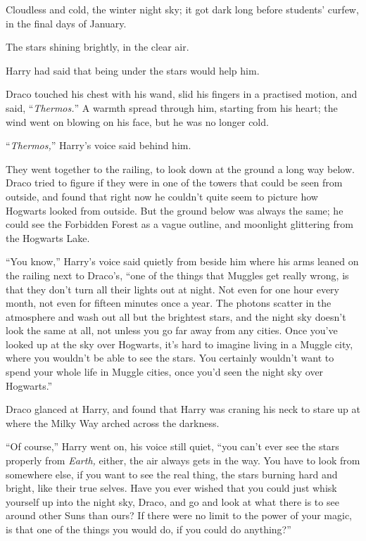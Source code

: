 Cloudless and cold, the winter night sky; it got dark long before students’ curfew, in the final days of January.

The stars shining brightly, in the clear air.

Harry had said that being under the stars would help him.

Draco touched his chest with his wand, slid his fingers in a practised motion, and said, “\emph{Thermos.}” A warmth spread through him, starting from his heart; the wind went on blowing on his face, but he was no longer cold.

“\emph{Thermos,}” Harry’s voice said behind him.

They went together to the railing, to look down at the ground a long way below. Draco tried to figure if they were in one of the towers that could be seen from outside, and found that right now he couldn’t quite seem to picture how Hogwarts looked from outside. But the ground below was always the same; he could see the Forbidden Forest as a vague outline, and moonlight glittering from the Hogwarts Lake.

“You know,” Harry’s voice said quietly from beside him where his arms leaned on the railing next to Draco’s, “one of the things that Muggles get really wrong, is that they don’t turn all their lights out at night. Not even for one hour every month, not even for fifteen minutes once a year. The photons scatter in the atmosphere and wash out all but the brightest stars, and the night sky doesn’t look the same at all, not unless you go far away from any cities. Once you’ve looked up at the sky over Hogwarts, it’s hard to imagine living in a Muggle city, where you wouldn’t be able to see the stars. You certainly wouldn’t want to spend your whole life in Muggle cities, once you’d seen the night sky over Hogwarts.”

Draco glanced at Harry, and found that Harry was craning his neck to stare up at where the Milky Way arched across the darkness.

“Of course,” Harry went on, his voice still quiet, “you can’t ever see the stars properly from \emph{Earth,} either, the air always gets in the way. You have to look from somewhere else, if you want to see the real thing, the stars burning hard and bright, like their true selves. Have you ever wished that you could just whisk yourself up into the night sky, Draco, and go and look at what there is to see around other Suns than ours? If there were no limit to the power of your magic, is that one of the things you would do, if you could do anything?”

